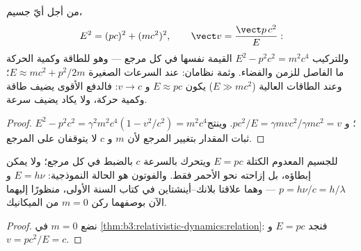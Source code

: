 \begin{theorem}\label{thm:b3:relativistic-dynamics:relation}
من أجل أيّ جسيم،
\[
E^2 = (pc)^2 + (mc^2)^2 ,
\qquad
\vect v = \frac{\vect p\,c^2}{E} :
\]
وللتركيب $E^2 - p^2c^2 = m^2c^4$ القيمة نفسها في كل
مرجع --- وهو للطاقة وكمية الحركة ما الفاصل للزمن
والفضاء. وثمة نظامان: عند السرعات الصغيرة $E \approx mc^2 + p^2/2m$؛
وعند الطاقات العالية ($E \gg mc^2$) يكون $E \approx pc$ و $v \to c$: فالدفع
الأقوى يضيف طاقة وكمية حركة، ولا يكاد يضيف سرعة.
\end{theorem}

\begin{proof}
$E^2 - p^2c^2 = \gamma^2m^2c^4(1 - v^2/c^2) = m^2c^4$؛ و $pc^2/E =
\gamma mvc^2/\gamma mc^2 = v$. وينتج ثبات المقدار بتغيير المرجع لأن $m$
و $c$ لا يتوقفان على المرجع.
\end{proof}

\begin{proposition}\label{prop:b3:relativistic-dynamics:massless}
للجسيم المعدوم الكتلة $E = pc$ ويتحرك بالسرعة $c$ بالضبط في كل
مرجع؛ ولا يمكن إبطاؤه، بل إزاحته نحو الأحمر فقط. والفوتون هو
الحالة النموذجية: $E = h\nu$ و $p = h\nu/c = h/\lambda$ --- وهما
علاقتا بلانك--أينشتاين في كتاب السنة الأولى، منظورًا إليهما الآن
بوصفهما ركن $m = 0$ من الميكانيك.
\end{proposition}

\begin{proof}
نضع $m = 0$ في \cref{thm:b3:relativistic-dynamics:relation}: فنجد $E = pc$
و $v = pc^2/E = c$.
\end{proof}

